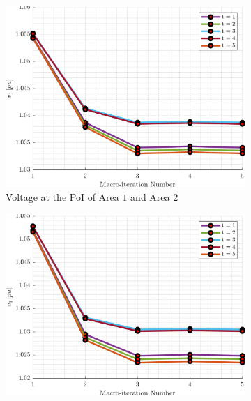 \documentclass[../../outputs/main.tex]{subfiles}
\begin{document}
\begin{figure}[h!]
    \begin{subfigure}[b]{0.3\textwidth}
        \centering
        \includegraphics[width=\textwidth]{../figures/T5-pv20-batt30-genCost/dopf/convergenceCurves/BoundaryVoltage_vs_t_vs_macroItr_T_5_Areas_1_2_genCost_pv_20_batt_30_crop.png}
        \caption{\scriptsize Voltage at the PoI of Area $1$ and Area $2$}
        \label{fig:voltage_1_2}
    \end{subfigure}
    \hfill
    \begin{subfigure}[b]{0.3\textwidth}
        \centering
        \includegraphics[width=\textwidth]{../figures/T5-pv20-batt30-genCost/dopf/convergenceCurves/BoundaryVoltage_vs_t_vs_macroItr_T_5_Areas_1_3_genCost_pv_20_batt_30_crop.png}

\end{subfigure}
\end{figure}
\end{document}
